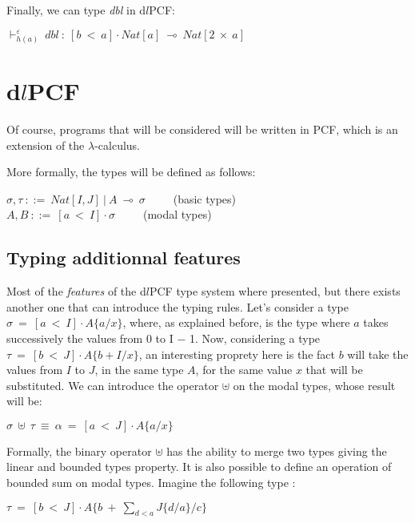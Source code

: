 \documentclass[a4paper,12pt]{article}
\begin{document}
Finally, we can type \emph{dbl} in d$l$PCF:

\begin{center}
$\vdash^{\varepsilon}_{h(a)}~dbl~:~[b~<~a] \cdot Nat[a]~\multimap~Nat[2~\times~a]$
\end{center}

\section{d$l$PCF}


Of course, programs that will be considered will be written in PCF, which is an
extension of the $\lambda$-calculus. 

More formally, the types will be defined as follows:

\begin{center}
  $\sigma, \tau~::=~Nat[I,J]~|~A~\multimap~\sigma$~~~~~(basic types) \\
  $A, B~::=~[a~<~I] \cdot \sigma$~~~~~(modal types)
\end{center}

\subsection{Typing additionnal features}


Most of the \emph{features} of the d$l$PCF type system where presented, but
there exists another one that can introduce the typing rules. Let's consider a
type $\sigma~=~[a~<~I] \cdot A\{a/x\}$, where, as explained before, is the type
where $a$ takes successively the values from 0 to I $-$ 1. Now, considering a
type $\tau~=~[b~<~J] \cdot A\{b+I/x\}$, an interesting proprety here is the fact
$b$ will take the values from $I$ to $J$, in the same type $A$, for the same value
$x$ that will be substituted. We can introduce the operator $\uplus$ on the
modal types, whose result will be:

\begin{center}
$\sigma~\uplus~\tau~\equiv~\alpha~=~[a~<~J] \cdot A\{a/x\}$
\end{center}

Formally, the binary operator $\uplus$ has the ability to merge two types giving
the linear and bounded types property. It is also possible to define an
operation of bounded sum on modal types. Imagine the following type :

\begin{center}
  $\tau~=~[b~<~J] \cdot A\{b~+~\sum_{d<a}J\{d/a\}/c\}$
\end{center}
\end{document}
